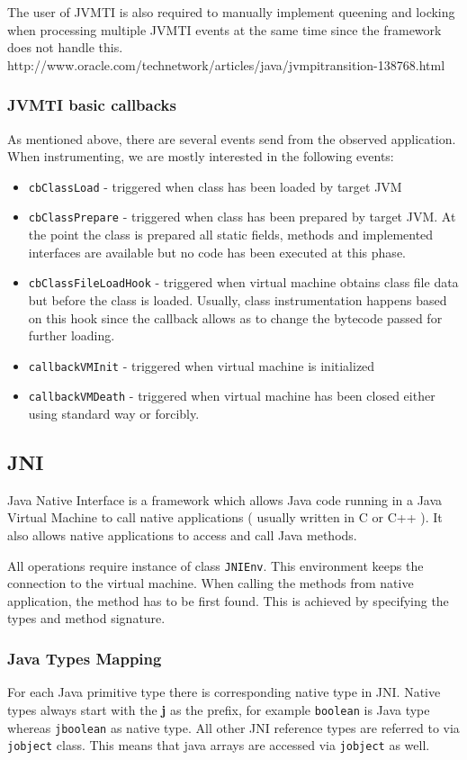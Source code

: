 The user of JVMTI is also required to manually implement queening and locking when processing multiple JVMTI events at the same time since the framework does not handle this. http://www.oracle.com/technetwork/articles/java/jvmpitransition-138768.html
\subsubsection{JVMTI basic callbacks}
As mentioned above, there are several events send from the observed application. When instrumenting, we are mostly interested in the following events:
\begin{itemize}
	\item  \texttt{cbClassLoad} - triggered when class has been loaded by target JVM
	\item \texttt{cbClassPrepare} - triggered when class has been prepared by target JVM. At the point the class is prepared all static fields, methods and implemented interfaces are available but no code has been executed at this phase.
	\item \texttt{cbClassFileLoadHook} - triggered when virtual machine obtains class file data but before the class is loaded. Usually, class instrumentation happens based on this hook since the callback allows as to change the bytecode passed for further loading.
	\item  \texttt{callbackVMInit} - triggered when virtual machine is initialized
	\item  \texttt{callbackVMDeath} - triggered when virtual machine has been closed either using standard way or forcibly.
\end{itemize}

\subsection{JNI}
Java Native Interface is a framework which allows Java code running in a Java Virtual Machine to call native applications ( usually written in C or C++ ). It also allows native applications to access and call Java methods.

All operations require instance of class \texttt{JNIEnv}. This environment keeps the connection to the virtual machine. When calling the methods from native application, the method has to be first found. This is achieved by specifying  the types and method signature.
\subsubsection{Java Types Mapping}
For each Java primitive type there is corresponding native type in JNI. Native types always start with the \textbf{j} as the prefix, for example \texttt{boolean} is Java type whereas \texttt{jboolean} as native type.
All other JNI reference types are referred to via \texttt{jobject} class. This means that java arrays are accessed via \texttt{jobject} as well.

